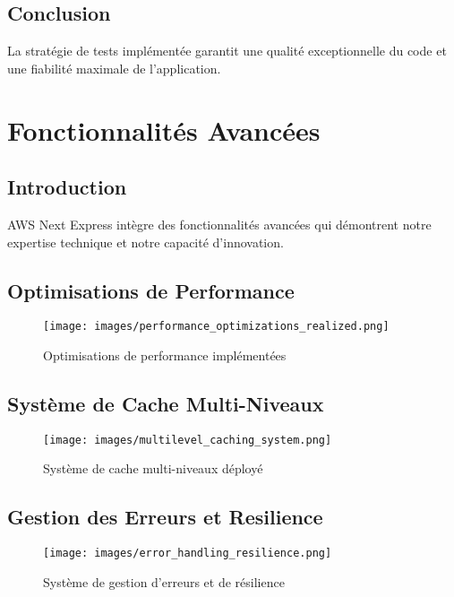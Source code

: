 \begin{table}[H]
\begin{table}[H]
\begin{table}[H]
\subsection{Conclusion}

La stratégie de tests implémentée garantit une qualité exceptionnelle du code et une fiabilité maximale de l'application.

\section{Fonctionnalités Avancées}

\subsection{Introduction}

AWS Next Express intègre des fonctionnalités avancées qui démontrent notre expertise technique et notre capacité d'innovation.

\subsection{Optimisations de Performance}

\begin{figure}[H]
    \centering
    \texttt{[image: images/performance\_optimizations\_realized.png]}
    \caption{Optimisations de performance implémentées}
    \label{fig:performance_optimizations}
\end{figure}

\subsection{Système de Cache Multi-Niveaux}

\begin{figure}[H]
    \centering
    \texttt{[image: images/multilevel\_caching\_system.png]}
    \caption{Système de cache multi-niveaux déployé}
    \label{fig:caching_system}
\end{figure}

\subsection{Gestion des Erreurs et Resilience}

\begin{figure}[H]
    \centering
    \texttt{[image: images/error\_handling\_resilience.png]}
    \caption{Système de gestion d'erreurs et de résilience}
    \label{fig:error_handling}
\end{figure}


\end{table}
\end{table}
\end{table}
